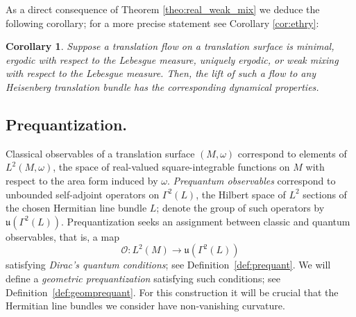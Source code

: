 \documentclass{amsart}
\newtheorem{corollary}[theorem]{Corollary}
\theoremstyle{definition}
\theoremstyle{remark}
\numberwithin{equation}{section}
\newcommand{\<}{{\langle}}
\renewcommand{\>}{{\rangle}}
\begin{document}
As a direct consequence of Theorem \ref{theo:real_weak_mix} we deduce the following corollary; for a more precise statement see Corollary \ref{cor:ethry}:

\begin{corollary}
    \label{cor:export}
    Suppose a translation flow on a translation surface is minimal, ergodic with respect to the Lebesgue measure, uniquely ergodic, or weak mixing with respect to the Lebesgue measure. Then, the lift of such a flow to any Heisenberg translation bundle has the corresponding dynamical properties.
\end{corollary}


\subsection{Prequantization.}\label{subsec:prequant} Classical observables of a translation surface $(M,\omega)$ correspond to elements of $L^2(M, \omega)$, the space of real-valued square-integrable functions on $M$ with respect to the area form induced by $\omega$. \textit{Prequantum observables} correspond to unbounded self-adjoint operators on $\Gamma^2(L)$, the Hilbert space of $L^2$ sections of the chosen Hermitian line bundle $L$; denote the group of such operators by $\mathfrak{u}(\Gamma^2(L))$. Prequantization seeks an assignment between classic and quantum observables, that is, a map \[
    \mathcal{O} \colon L^2(M) \to \mathfrak{u}(\Gamma^2(L))
    \] satisfying \textit{Dirac's quantum conditions}; see Definition~\ref{def:prequant}. We will define a \textit{geometric prequantization} satisfying such conditions; see Definition~\ref{def:geomprequant}. For this construction it will be crucial that the Hermitian line bundles we consider have non-vanishing curvature. 
\end{document}
